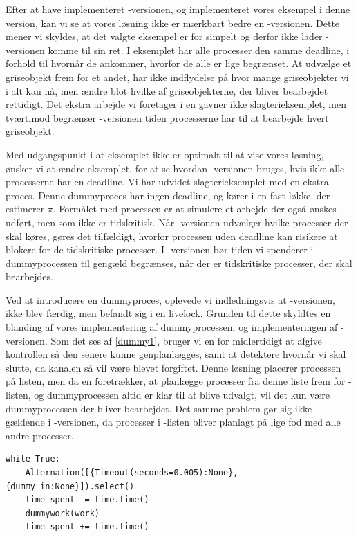 Efter at have implementeret -versionen, og implementeret vores eksempel i denne version, kan vi se at vores løsning ikke er mærkbart bedre en -versionen. Dette mener vi skyldes, at det valgte eksempel er for simpelt og derfor ikke lader -versionen komme til sin ret. I eksemplet har alle processer den samme deadline, i forhold til hvornår de ankommer, hvorfor de alle er lige begrænset. At udvælge et griseobjekt frem for et andet, har ikke indflydelse på  hvor mange griseobjekter vi i alt kan nå, men ændre blot hvilke af griseobjekterne, der bliver bearbejdet rettidigt. Det ekstra arbejde vi foretager i \sched en gavner ikke slagterieksemplet, men tværtimod begrænser -versionen tiden processerne har til at bearbejde hvert griseobjekt.

Med udgangspunkt i at eksemplet ikke er optimalt til at vise vores løsning, ønsker vi at ændre eksemplet, for at se hvordan -versionen bruges, hvis ikke alle processerne har en deadline. Vi har udvidet slagterieksemplet med en ekstra proces. Denne dummyproces har ingen deadline, og kører i en fast løkke, der estimerer $\pi$. Formålet med processen er at simulere et arbejde der også ønskes udført, men som ikke er tidskritisk. Når -versionen udvælger hvilke processer der skal køres, gøres det tilfældigt, hvorfor processen uden deadline kan risikere at blokere for de tidskritiske processer. I -versionen bør tiden vi spenderer i  dummyprocessen til gengæld begrænses, når der er tidskritiske processer, der skal bearbejdes.

Ved at introducere en dummyproces, oplevede vi indledningsvis at -versionen, ikke blev færdig, men befandt sig i en  livelock. Grunden til dette skyldtes  en blanding af vores implementering af dummyprocessen, og implementeringen af -versionen. Som det ses af \cref{dummy1}, bruger vi en  for midlertidigt at afgive kontrollen så den senere kunne genplanlægges, samt at detektere hvornår vi skal slutte, da kanalen så vil være blevet forgiftet.
Denne løsning placerer processen på listen, men da \sched en foretrækker, at planlægge processer fra denne liste frem for -listen, og dummyprocessen altid er klar til at blive udvalgt, vil det kun være dummyprocessen der bliver bearbejdet. Det samme problem gør sig ikke gældende i -versionen, da processer i -listen bliver planlagt på lige fod med alle andre processer.

\begin{lstlisting}[firstnumber=1,float=hbtp, label=dummy1, caption=Uddrag af Dummyproces]
while True:
    Alternation([{Timeout(seconds=0.005):None}, {dummy_in:None}]).select()
    time_spent -= time.time()
    dummywork(work)
    time_spent += time.time()          
\end{lstlisting}


